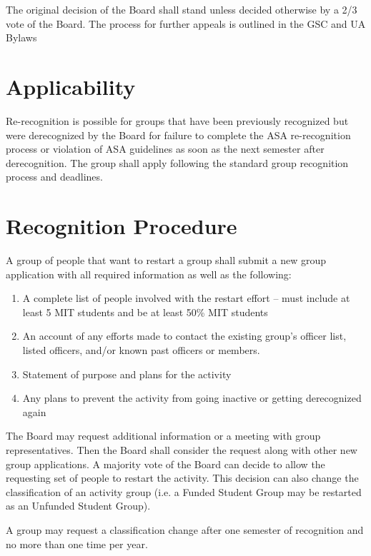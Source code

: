 \documentclass[12pt]{article}
\begin{document}
The original decision of the Board shall stand unless decided otherwise by a 2/3 vote of the Board. The
    process for further appeals is outlined in the GSC and UA Bylaws


\section{Applicability}
Re-recognition is possible for groups that have been previously recognized but were derecognized by the
    Board for failure to complete the ASA re-recognition process or violation of ASA guidelines as soon
    as the next semester after derecognition.
The group shall apply following the standard group recognition process and deadlines.

\section{Recognition Procedure}
A group of people that want to restart a group shall submit a new group application with all required
    information as well as the following:
\begin{enumerate}
    \item A complete list of people involved with the restart effort -- must include at least 5 MIT
        students and be at least 50\% MIT students
    \item An account of any efforts made to contact the existing group's officer list, listed officers,
        and/or known past officers or members.
    \item Statement of purpose and plans for the activity
    \item Any plans to prevent the activity from going inactive or getting derecognized again
\end{enumerate}
The Board may request additional information or a meeting with group representatives.
Then the Board shall consider the request along with other new group applications.
A majority vote of the Board can decide to allow the requesting set of people to restart the activity.
This decision can also change the classification of an activity group (i.e. a Funded Student Group
    may be restarted as an Unfunded Student Group).

A group may request a classification change after one semester of recognition and no more than one
    time per year.
\\
\end{document}
